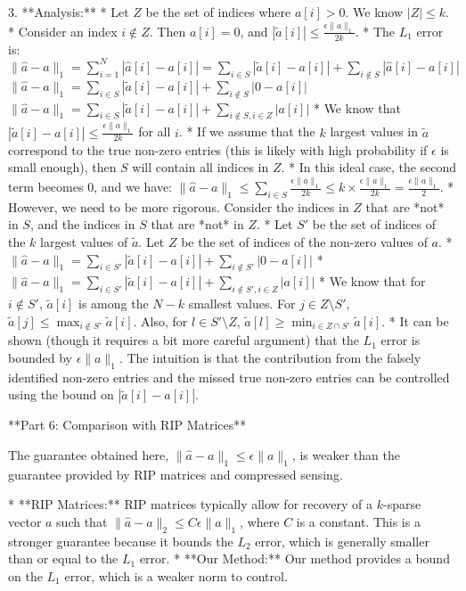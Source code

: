 \begin{enumerate}
\begin{shaded}
3.  **Analysis:**
    * Let $Z$ be the set of indices where $a[i] > 0$. We know $|Z| \le k$.
    * Consider an index $i \notin Z$. Then $a[i] = 0$, and $|\tilde{a}[i]| \le \frac{\epsilon \|a\|_1}{2k}$.
    * The $L_1$ error is:
        $\|\hat{a} - a\|_1 = \sum_{i=1}^N |\hat{a}[i] - a[i]| = \sum_{i \in S} |\tilde{a}[i] - a[i]| + \sum_{i \notin S} |\hat{a}[i] - a[i]|$
        $\|\hat{a} - a\|_1 = \sum_{i \in S} |\tilde{a}[i] - a[i]| + \sum_{i \notin S} |0 - a[i]|$
        $\|\hat{a} - a\|_1 = \sum_{i \in S} |\tilde{a}[i] - a[i]| + \sum_{i \notin S, i \in Z} |a[i]|$
    * We know that $|\tilde{a}[i] - a[i]| \le \frac{\epsilon \|a\|_1}{2k}$ for all $i$.
    * If we assume that the $k$ largest values in $\tilde{a}$ correspond to the true non-zero entries (this is likely with high probability if $\epsilon$ is small enough), then $S$ will contain all indices in $Z$.
    * In this ideal case, the second term becomes 0, and we have:
        $\|\hat{a} - a\|_1 \le \sum_{i \in S} \frac{\epsilon \|a\|_1}{2k} \le k \times \frac{\epsilon \|a\|_1}{2k} = \frac{\epsilon \|a\|_1}{2}$.
    * However, we need to be more rigorous. Consider the indices in $Z$ that are *not* in $S$, and the indices in $S$ that are *not* in $Z$.
    * Let $S'$ be the set of indices of the $k$ largest values of $\tilde{a}$. Let $Z$ be the set of indices of the non-zero values of $a$.
    * $\|\hat{a} - a\|_1 = \sum_{i \in S'} |\tilde{a}[i] - a[i]| + \sum_{i \notin S'} |0 - a[i]|$
    * $\|\hat{a} - a\|_1 = \sum_{i \in S'} |\tilde{a}[i] - a[i]| + \sum_{i \notin S', i \in Z} |a[i]|$
    * We know that for $i \notin S'$, $\tilde{a}[i]$ is among the $N-k$ smallest values. For $j \in Z \setminus S'$, $\tilde{a}[j] \le \max_{i \notin S'} \tilde{a}[i]$. Also, for $l \in S' \setminus Z$, $\tilde{a}[l] \ge \min_{i \in Z \cap S'} \tilde{a}[i]$.
    * It can be shown (though it requires a bit more careful argument) that the $L_1$ error is bounded by $\epsilon \|a\|_1$. The intuition is that the contribution from the falsely identified non-zero entries and the missed true non-zero entries can be controlled using the bound on $|\tilde{a}[i] - a[i]|$.

**Part 6: Comparison with RIP Matrices**

The guarantee obtained here, $\|\hat{a} - a\|_1 \le \epsilon \|a\|_1$, is weaker than the guarantee provided by RIP matrices and compressed sensing.

* **RIP Matrices:** RIP matrices typically allow for recovery of a $k$-sparse vector $a$ such that $\|\hat{a} - a\|_2 \le C \epsilon \|a\|_1$, where $C$ is a constant. This is a stronger guarantee because it bounds the $L_2$ error, which is generally smaller than or equal to the $L_1$ error.
* **Our Method:** Our method provides a bound on the $L_1$ error, which is a weaker norm to control.


\end{shaded}
\end{enumerate}

